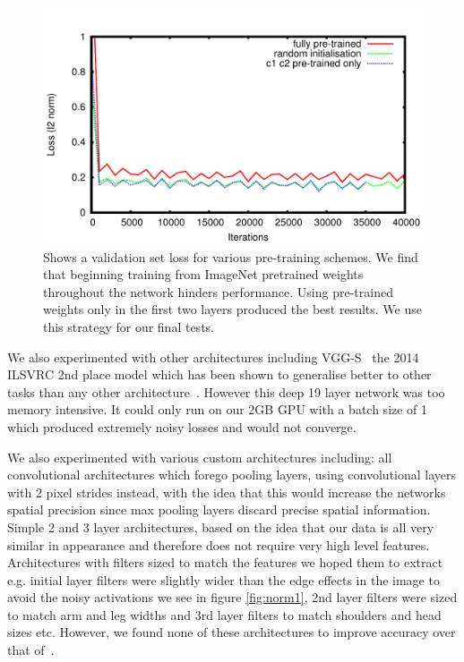 \documentclass[11pt]{article} %
\begin{document}
\begin{figure}
\centering
\includegraphics*[width=0.9\linewidth,clip]{alexNetComp.pdf} 
\caption{Shows a validation set loss for various pre-training schemes. We find that beginning training from ImageNet pretrained weights throughout the network hinders performance. Using pre-trained weights only in the first two layers produced the best results. We use this strategy for our final tests. \label{fig:alexNetpre}}
\end{figure}

We also experimented with other architectures including VGG-S~\cite{Simonyan2015} the 2014 ILSVRC 2nd place model which has been shown to generalise better to other tasks than any other architecture~\cite{Chatfield2014}. However this deep 19 layer network was too memory intensive. It could only run on our 2GB GPU with a batch size of 1 which produced extremely noisy losses and would not converge. 

We also experimented with various custom architectures including: all convolutional architectures which forego pooling layers, using convolutional layers with 2 pixel strides instead, with the idea that this would increase the networks spatial precision since max pooling layers discard precise spatial information. Simple 2 and 3 layer architectures, based on the idea that our data is all very similar in appearance and therefore does not require very high level features. Architectures with filters sized to match the features we hoped them to extract e.g. initial layer filters were slightly wider than the edge effects in the image to avoid the noisy activations we see in figure \ref{fig:norm1}, 2nd layer filters were sized to match arm and leg widths and 3rd layer filters to match shoulders and head sizes etc. However, we found none of these architectures to improve accuracy over that of~\cite{Krizhevsky2012}. 
\end{document}
